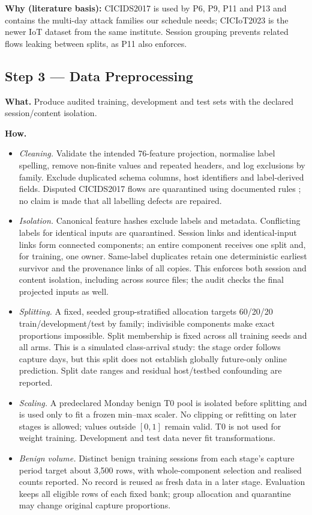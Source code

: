 \documentclass[10pt,a4paper]{article}
\newcommand{\why}[1]{\par\nopagebreak[4]\noindent\colorbox{black!5}{\parbox{\dimexpr\linewidth-2\fboxsep}{\small\textbf{Why (literature basis):} #1}}\par}
\begin{document}
\why{CICIDS2017 is used by P6, P9, P11 and P13 and contains the multi-day attack families our schedule needs; CICIoT2023 is the newer IoT dataset from the same institute. Session grouping prevents related flows leaking between splits, as P11 also enforces.}

\subsection{Step 3 --- Data Preprocessing}
\textbf{What.} Produce audited training, development and test sets with the declared session/content isolation.

\textbf{How.}
\begin{itemize}
\item \emph{Cleaning.} Validate the intended 76-feature projection, normalise label spelling, remove non-finite values and repeated headers, and log exclusions by family. Exclude duplicated schema columns, host identifiers and label-derived fields. Disputed CICIDS2017 flows are quarantined using documented rules \cite{engelen}; no claim is made that all labelling defects are repaired.
\item \emph{Isolation.} Canonical feature hashes exclude labels and metadata. Conflicting labels for identical inputs are quarantined. Session links and identical-input links form connected components; an entire component receives one split and, for training, one owner. Same-label duplicates retain one deterministic earliest survivor and the provenance links of all copies. This enforces both session and content isolation, including across source files; the audit checks the final projected inputs as well.
\item \emph{Splitting.} A fixed, seeded group-stratified allocation targets 60/20/20 train/development/test by family; indivisible components make exact proportions impossible. Split membership is fixed across all training seeds and all arms. This is a simulated class-arrival study: the stage order follows capture days, but this split does not establish globally future-only online prediction. Split date ranges and residual host/testbed confounding are reported.
\item \emph{Scaling.} A predeclared Monday benign T0 pool is isolated before splitting and is used only to fit a frozen min--max scaler. No clipping or refitting on later stages is allowed; values outside $[0,1]$ remain valid. T0 is not used for weight training. Development and test data never fit transformations.
\item \emph{Benign volume.} Distinct benign training sessions from each stage's capture period target about 3,500 rows, with whole-component selection and realised counts reported. No record is reused as fresh data in a later stage. Evaluation keeps all eligible rows of each fixed bank; group allocation and quarantine may change original capture proportions.

\end{itemize}
\end{document}
